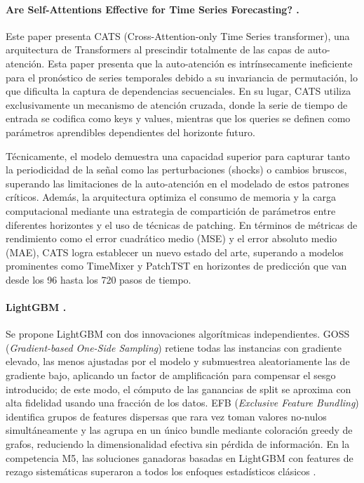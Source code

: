 \documentclass{article}
\begin{document}
\paragraph{Are Self-Attentions Effective for Time Series Forecasting? \citep{kim2024cats}.}
Este paper presenta CATS (Cross-Attention-only Time Series transformer), una arquitectura de Transformers al prescindir totalmente de las capas de auto-atención. Esta paper presenta que la auto-atención es intrínsecamente ineficiente para el pronóstico de series temporales debido a su invariancia de permutación, lo que dificulta la captura de dependencias secuenciales. En su lugar, CATS utiliza exclusivamente un mecanismo de atención cruzada, donde la serie de tiempo de entrada se codifica como keys y values, mientras que los queries se definen como parámetros aprendibles dependientes del horizonte futuro.

Técnicamente, el modelo demuestra una capacidad superior para capturar tanto la periodicidad de la señal como las perturbaciones (shocks) o cambios bruscos, superando las limitaciones de la auto-atención en el modelado de estos patrones críticos. Además, la arquitectura optimiza el consumo de memoria y la carga computacional mediante una estrategia de compartición de parámetros entre diferentes horizontes y el uso de técnicas de patching. En términos de métricas de rendimiento como el error cuadrático medio (MSE) y el error absoluto medio (MAE), CATS logra establecer un nuevo estado del arte, superando a modelos prominentes como TimeMixer y PatchTST en horizontes de predicción que van desde los 96 hasta los 720 pasos de tiempo.

\paragraph{LightGBM \citep{ke2017lightgbm}.}
Se propone LightGBM con dos innovaciones algorítmicas independientes. GOSS (\textit{Gradient-based One-Side Sampling}) retiene todas las instancias con gradiente elevado, las menos ajustadas por el modelo y submuestrea aleatoriamente las de gradiente bajo, aplicando un factor de amplificación para compensar el sesgo introducido; de este modo, el cómputo de las ganancias de split se aproxima con alta fidelidad usando una fracción de los datos. EFB (\textit{Exclusive Feature Bundling}) identifica grupos de features dispersas que rara vez toman valores no-nulos simultáneamente y las agrupa en un único bundle mediante coloración greedy de grafos, reduciendo la dimensionalidad efectiva sin pérdida de información. En la competencia M5, las soluciones ganadoras basadas en LightGBM con features de rezago sistemáticas superaron a todos los enfoques estadísticos clásicos \citep{makridakis2022m5, m5first2020}.
\end{document}
